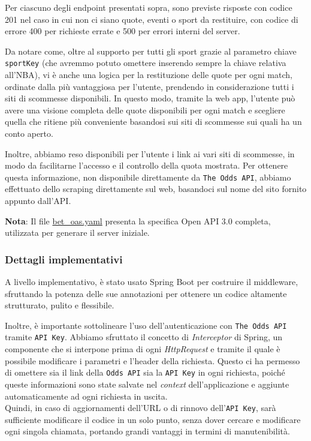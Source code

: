 \noindent Per ciascuno degli endpoint presentati sopra, sono previste risposte con codice 201 nel caso in cui non ci siano quote, eventi o sport da restituire, con codice di errore 400 per richieste errate e 500 per errori interni del server.

Da notare come, oltre al supporto per tutti gli sport grazie al parametro chiave \texttt{sportKey} (che avremmo potuto omettere inserendo sempre la chiave relativa all'NBA), vi è anche una logica per la restituzione delle quote per ogni match, ordinate dalla più vantaggiosa per l'utente, prendendo in considerazione tutti i siti di scommesse disponibili. In questo modo, tramite la web app, l'utente può avere una visione completa delle quote disponibili per ogni match e scegliere quella che ritiene più conveniente basandosi sui siti di scommesse sui quali ha un conto aperto.

Inoltre, abbiamo reso disponibili per l'utente i link ai vari siti di scommesse, in modo da facilitarne l'accesso e il controllo della quota mostrata. Per ottenere questa informazione, non disponibile direttamente da \texttt{The Odds API}, abbiamo effettuato dello scraping direttamente sul web, basandoci sul nome del sito fornito appunto dall'API.

\noindent \textbf{Nota}: Il file \href{run:../documents/bet_oas.yaml}{bet\_oas.yaml} presenta la specifica Open API 3.0 completa, utilizzata per generare il server iniziale.


\subsubsection{Dettagli implementativi}
A livello implementativo, è stato usato Spring Boot per costruire il middleware, sfruttando la potenza delle sue annotazioni per ottenere un codice altamente strutturato, pulito e flessibile. 

Inoltre, è importante sottolineare l'uso dell'autenticazione con \texttt{The Odds API} tramite \texttt{API Key}. Abbiamo sfruttato il concetto di \textit{Interceptor} di Spring, un componente che si interpone prima di ogni \textit{HttpRequest} e tramite il quale è possibile modificare i parametri e l'header della richiesta. Questo ci ha permesso di omettere sia il link della \texttt{Odds API} sia la \texttt{API Key} in ogni richiesta, poiché queste informazioni sono state salvate nel \textit{context} dell'applicazione e aggiunte automaticamente ad ogni richiesta in uscita.\\
Quindi, in caso di aggiornamenti dell'URL o di rinnovo dell'\texttt{API Key}, sarà sufficiente modificare il codice in un solo punto, senza dover cercare e modificare ogni singola chiamata, portando grandi vantaggi in termini di manutenibilità.



